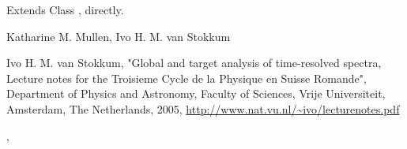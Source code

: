 \documentclass{article}
\begin{document}
\begin{Section}{Extends}
Class , directly.
\end{Section}
\begin{Author}\relax
Katharine M. Mullen, Ivo H. M. van Stokkum
\end{Author}
\begin{References}\relax
Ivo H. M. van Stokkum, 
"Global and target analysis of time-resolved spectra, Lecture notes
for the Troisieme Cycle de la Physique en Suisse Romande", 
Department of Physics and Astronomy, Faculty of Sciences, Vrije Universiteit,
Amsterdam, The Netherlands, 2005, 
\url{http://www.nat.vu.nl/~ivo/lecturenotes.pdf}
\end{References}
\begin{SeeAlso}\relax
{},
\end{SeeAlso}
\end{document}
